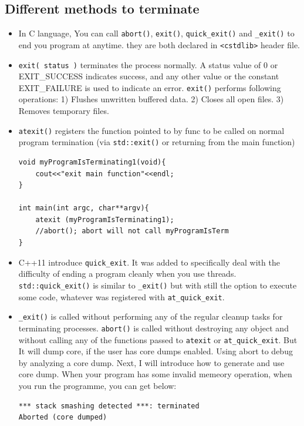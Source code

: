 \documentclass[a4paper,11pt,twoside]{book}
\begin{document}
\subsection{Different methods to terminate}
\begin{itemize}
	\item In C language, You can call \texttt{abort()}, \texttt{exit()}, \texttt{quick\_exit()} and  \texttt{\_exit()} to end you program at anytime. they are both declared in \texttt{<cstdlib>} header file.
	
	\item \texttt{exit( status )} terminates the process normally. A status value of 0 or EXIT\_SUCCESS indicates success, and any other value or the constant EXIT\_FAILURE is used to indicate an error. \texttt{exit()} performs following operations: 1) Flushes unwritten buffered data. 2) Closes all open files. 3) Removes temporary files.
	
	\item \texttt{atexit()} registers the function pointed to by func to be called on normal program termination (via \texttt{std::exit()} or returning from the main function)
\begin{lstlisting}[]
void myProgramIsTerminating1(void){
	cout<<"exit main function"<<endl;
}
	
int main(int argc, char**argv){
	atexit (myProgramIsTerminating1);
	//abort(); abort will not call myProgramIsTerm
}
\end{lstlisting}	

	\item C++11 introduce \texttt{quick\_exit}. It was added to specifically deal with the difficulty of ending a program cleanly when you use threads. \texttt{std::quick\_exit()} is similar to \texttt{\_exit()} but with still the option to execute some code, whatever was registered with \texttt{at\_quick\_exit}.
	
	\item \texttt{\_exit()} is called without performing any of the regular cleanup tasks for terminating processes. \texttt{abort()} is called without destroying any object and without calling any of the functions passed to \texttt{atexit} or \texttt{at\_quick\_exit}. But It will dump core, if the user has core dumps enabled. Using abort to debug by analyzing a core dump. Next, I will introduce how to generate and use core dump. When your program has some invalid memeory operation, when you run the programme, you can get below:
\begin{lstlisting}[]
*** stack smashing detected ***: terminated
Aborted (core dumped)
\end{lstlisting}


\end{itemize}
\end{document}
